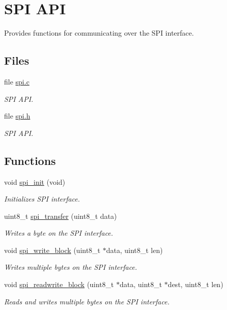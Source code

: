 \hypertarget{group___s_p_i}{\section{S\-P\-I A\-P\-I}
\label{group___s_p_i}
}


Provides functions for communicating over the S\-P\-I interface.  


\subsection*{Files}
\begin{DoxyCompactItemize}
\item 
file \hyperlink{spi_8c}{spi.\-c}
\begin{DoxyCompactList}\small\item\em S\-P\-I A\-P\-I. \end{DoxyCompactList}\item 
file \hyperlink{spi_8h}{spi.\-h}
\begin{DoxyCompactList}\small\item\em S\-P\-I A\-P\-I. \end{DoxyCompactList}\end{DoxyCompactItemize}
\subsection*{Functions}
\begin{DoxyCompactItemize}
\item 
\hypertarget{group___s_p_i_gae909944aa85ae98323073c628be541aa}{void \hyperlink{group___s_p_i_gae909944aa85ae98323073c628be541aa}{spi\-\_\-init} (void)}\label{group___s_p_i_gae909944aa85ae98323073c628be541aa}

\begin{DoxyCompactList}\small\item\em Initializes S\-P\-I interface. \end{DoxyCompactList}\item 
uint8\-\_\-t \hyperlink{group___s_p_i_ga50084189a01c481aebe4e4d1e1968910}{spi\-\_\-transfer} (uint8\-\_\-t data)
\begin{DoxyCompactList}\small\item\em Writes a byte on the S\-P\-I interface. \end{DoxyCompactList}\item 
void \hyperlink{group___s_p_i_gabcccbbc7e107f446dd6bbfaed2c36626}{spi\-\_\-write\-\_\-block} (uint8\-\_\-t $\ast$data, uint8\-\_\-t len)
\begin{DoxyCompactList}\small\item\em Writes multiple bytes on the S\-P\-I interface. \end{DoxyCompactList}\item 
void \hyperlink{group___s_p_i_gae3e37045e4017de757fd108c18334ec2}{spi\-\_\-readwrite\-\_\-block} (uint8\-\_\-t $\ast$data, uint8\-\_\-t $\ast$dest, uint8\-\_\-t len)
\begin{DoxyCompactList}\small\item\em Reads and writes multiple bytes on the S\-P\-I interface. \end{DoxyCompactList}\end{DoxyCompactItemize}


